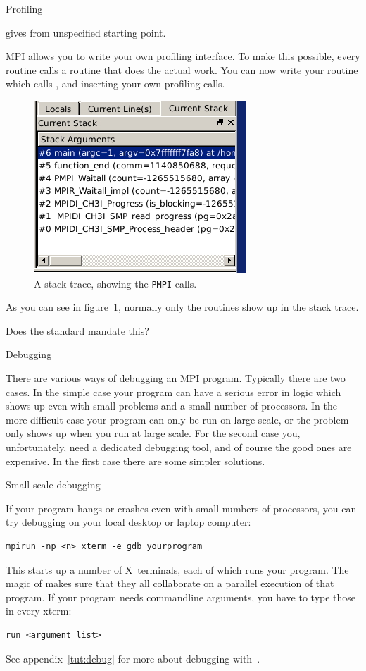  {Profiling}
\label{sec:profile}

 gives  from
unspecified starting point.

MPI allows you to write your own profiling interface. To make this possible,
every routine  calls a routine  that 
does the actual work. You can now write your  routine
which calls , and inserting your own profiling calls.
\begin{figure}
  \includegraphics[scale=.7]{graphics/pmpi}
  \caption{A stack trace, showing the \texttt{PMPI} calls.}
  \label{fig:pmpi}
\end{figure}
As you can see in figure~\ref{fig:pmpi}, normally only the  routines
show up in the stack trace.

Does the standard mandate this?

 {Debugging}
\label{sec:debug}

There are various ways of debugging an MPI program. Typically there
are two cases. In the simple case your program can have a serious
error in logic which shows up even with small problems and a small
number of processors. In the more difficult case your program can only
be run on large scale, or the problem only shows up when you run at
large scale. For the second case you, unfortunately, need a dedicated
debugging tool, and of course the good ones are expensive. In the
first case there are some simpler solutions.

 {Small scale debugging}

If your program hangs or crashes even with small numbers of
processors, you can try debugging on your local desktop or laptop
computer:
\begin{verbatim}
mpirun -np <n> xterm -e gdb yourprogram
\end{verbatim}
This starts up a number of X~terminals, each of which runs your
program. The magic of  makes sure that they all collaborate
on a parallel execution of that program. If your program needs
commandline arguments, you have to type those in every xterm:
\begin{verbatim}
run <argument list>
\end{verbatim}
See appendix~\ref{tut:debug} for more about debugging with~.

